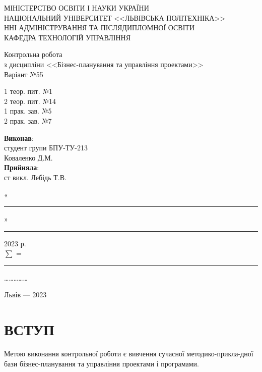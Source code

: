 \documentclass[oneside,14pt]{extarticle}
\begin{document}
\begin{titlepage}
	\begin{center}
МІНІСТЕРСТВО ОСВІТИ І НАУКИ УКРАЇНИ\\
НАЦІОНАЛЬНИЙ УНІВЕРСИТЕТ <<ЛЬВІВСЬКА ПОЛІТЕХНІКА>>\\
ННІ АДМІНІСТРУВАННЯ ТА ПІСЛЯДИПЛОМНОЇ ОСВІТИ\\
КАФЕДРА ТЕХНОЛОГІЙ УПРАВЛІННЯ

		
		\vspace{80pt}
Контрольна робота\\
з дисципліни <<Бізнес-планування та управління проектами>>\\
Варіант №55
\begin{flushleft}
	1 теор. пит. №1\\
	2 теор. пит. №14\\
	1 прак. зав. №5\\
	2 прак. зав. №7\\
\end{flushleft}
		\vspace*{20pt}
		
		\begin{flushright}
			\textbf{Виконав}:\\
			
			студент групи БПУ-ТУ-213\\
			Коваленко Д.М.\\
			\vspace{10pt}
			\textbf{Прийняла}:\\
			ст викл. Лебідь Т.В.
			
			\vspace{28pt}
			«\rule{1cm}{0.15mm}» \rule{1.5cm}{0.15mm} 2023 р.\\
			$\sum$ = \rule{1cm}{0.15mm}……………\\
			
		\end{flushright}
		\vspace{\fill}
		Львів — 2023
	\end{center}
\end{titlepage}
\setcounter{page}{2}
\tableofcontents
\newpage

\section*{ВСТУП}
Метою виконання контрольної роботи є вивчення сучасної методико-прикла-дної бази бізнес-планування та управління проектами і програмами.
\end{document}

